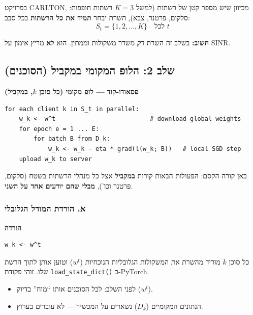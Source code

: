 \documentclass[11pt,a4paper]{article}
\newenvironment{infobox}[2][gray]{%
  \par\smallskip
  \begin{mdframed}[
    linecolor=#1!60!black,
    linewidth=0.7pt,
    backgroundcolor=#1!6,
    roundcorner=3pt,
    innertopmargin=7pt,
    innerbottommargin=7pt,
    innerleftmargin=8pt,
    innerrightmargin=8pt,
    skipabove=6pt,
    skipbelow=6pt
  ]%
  {\color{#1!70!black}\bfseries #2}\par\smallskip
}{%
  \end{mdframed}%
  \par\smallskip
}
\newenvironment{codebox}[1]{\begin{infobox}[gray]{#1}\begin{english}\setLTR}{\end{english}\end{infobox}}
\begin{document}
בפרויקט CARLTON, מכיוון שיש מספר קטן של רשתות (למשל $K{=}3$ רשתות חופפות: סלקום, פרטנר, צבא),
השרת יבחר \textbf{תמיד את כל הרשתות} בכל סבב:
\[
  S_t = \{1, 2, \ldots, K\} \quad \text{לכל } t
\]

\textbf{חשוב:} בשלב זה השרת \emph{רק} משדר משקולות וממתין.
הוא \textbf{לא} מריץ אימון על SINR.

\subsection{שלב 2: הלופ המקומי במקביל (הסוכנים)}
\label{subsec:step2-local-parallel}

\begin{codebox}{פסאודו-קוד --- לופ מקומי (כל סוכן $k$, במקביל)}
\begin{lstlisting}[language={}]
for each client k in S_t in parallel:
    w_k <- w^t                          # download global weights
    for epoch e = 1 ... E:
        for batch B from D_k:
            w_k <- w_k - eta * grad(l(w_k; B))   # local SGD step
    upload w_k to server
\end{lstlisting}
\end{codebox}

כאן קורה הקסם: הפעולות הבאות קורות \textbf{במקביל} אצל כל מנהלי הרשתות בשטח (סלקום, פרטנר וכו'),
\textbf{מבלי שהם יודעים אחד על השני}.

\subsubsection{א. הורדת המודל הגלובלי}

\begin{codebox}{הורדה}
\begin{lstlisting}[language={}]
w_k <- w^t
\end{lstlisting}
\end{codebox}

כל סוכן $k$ מוריד מהשרת את המשקולות הגלובליות הנוכחיות ($w^t$) וטוען אותן לתוך הרשת שלו.
זוהי פקודת \texttt{load\_state\_dict()} ב-PyTorch.

\begin{itemize}
  \item לפני השלב: לכל הסוכנים אותו ``מוח'' בדיוק ($w^t$).
  \item הנתונים המקומיים ($D_k$) נשארים על המכשיר --- לא עוברים בערוץ.
\end{itemize}
\end{document}

